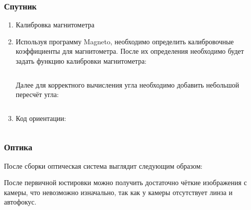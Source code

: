 \solutionSection

\subsubsection*{Спутник}

\begin{enumerate}
    \item Калибровка магнитометра
    \item 
    Используя программу Magneto, необходимо определить калибровочные коэффициенты для магнитометра. После их определения необходимо будет задать функцию калибровки магнитометра:
    
    \inputminted[fontsize=\footnotesize, linenos]{python}{final/command_tour/dzz/task_02/source_1.py}

    Далее для корректного вычисления угла необходимо добавить небольшой пересчёт угла:

    \inputminted[fontsize=\footnotesize, linenos]{python}{final/command_tour/dzz/task_02/source_2.py}

    \item Код ориентации:
    
    \inputminted[fontsize=\footnotesize, linenos]{python}{final/command_tour/dzz/task_02/source_3.py}

\end{enumerate}

\subsubsection*{Оптика}

После сборки оптическая система выглядит следующим образом:


После первичной юстировки можно получить достаточно чёткие изображения с камеры, что невозможно изначально, так как у камеры отсутствует линза и автофокус.

